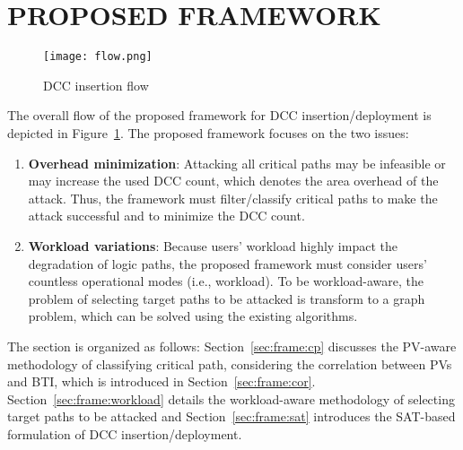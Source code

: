 
\section{PROPOSED FRAMEWORK}
\label{sec:frame}
\begin{figure}
	\centering
	\texttt{[image: flow.png]}
	\caption{DCC insertion flow}
	\label{fig:flow}
\end{figure}
\begin{comment}
\begin{figure}
	\centering
	\texttt{[image: pathset.png]}
	\caption{Classification of critical paths}
	\label{fig:set}
\end{figure}
\end{comment}
The overall flow of the proposed framework for DCC insertion/deployment is depicted in Figure~\ref{fig:flow}. The proposed framework focuses on the two issues: 
\begin{enumerate}
	\item \textbf{Overhead minimization}: Attacking all critical paths may be infeasible or may increase the used DCC count, which denotes the area overhead of the attack. Thus, the framework must filter/classify critical paths to make the attack successful and to minimize the DCC count. 
	\item \textbf{Workload variations}: Because users' workload highly impact the degradation of logic paths, the proposed framework must consider users' countless operational modes (i.e., workload). To be workload-aware, the problem of selecting target paths to be attacked is transform to a graph problem, which can be solved using the existing algorithms. 
\end{enumerate}


The section is organized as follows: Section~\ref{sec:frame:cp} discusses the PV-aware methodology of classifying critical path, considering the correlation between PVs and BTI, which is introduced in Section~\ref{sec:frame:cor}. Section~\ref{sec:frame:workload} details the workload-aware methodology of selecting target paths to be attacked and Section~\ref{sec:frame:sat} introduces the SAT-based formulation of DCC insertion/deployment.
